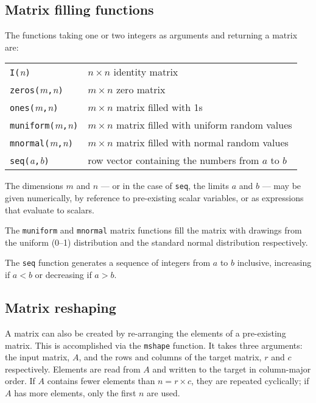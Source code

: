 \subsection{Matrix filling functions}
\label{matrix-fill}

The functions taking one or two integers as arguments and returning
a matrix are:

\begin{center}
\begin{tabular}{ll}
\texttt{I(}\textsl{n}\texttt{)} & $n\times n$ identity matrix \\
\texttt{zeros(}\textsl{m}\texttt{,}\textsl{n}\texttt{)} & 
   $m\times n$ zero matrix \\
\texttt{ones(}\textsl{m}\texttt{,}\textsl{n}\texttt{)} &
   $m\times n$ matrix filled with 1s \\
\texttt{muniform(}\textsl{m}\texttt{,}\textsl{n}\texttt{)} &
   $m\times n$ matrix filled with uniform random values \\
\texttt{mnormal(}\textsl{m}\texttt{,}\textsl{n}\texttt{)} &
   $m\times n$ matrix filled with normal random values \\
\texttt{seq(}\textsl{a}\texttt{,}\textsl{b}\texttt{)} &
   row vector containing the numbers from $a$ to $b$
\end{tabular}
\end{center}

The dimensions $m$ and $n$ --- or in the case of \texttt{seq}, the
limits $a$ and $b$ --- may be given numerically, by reference to
pre-existing scalar variables, or as expressions that evaluate to
scalars.

The \texttt{muniform} and \texttt{mnormal} matrix functions fill the
matrix with drawings from the uniform (0--1) distribution and the
standard normal distribution respectively.

The \texttt{seq} function generates a sequence of integers from $a$
to $b$ inclusive, increasing if $a<b$ or decreasing if $a>b$.

\subsection{Matrix reshaping}
\label{matrix-mshape}

A matrix can also be created by re-arranging the elements of a
pre-existing matrix. This is accomplished via the \texttt{mshape}
function. It takes three arguments: the input matrix, $A$, and the
rows and columns of the target matrix, $r$ and $c$ respectively.
Elements are read from $A$ and written to the target in column-major
order.  If $A$ contains fewer elements than $n = r \times c$, they are
repeated cyclically; if $A$ has more elements, only the first $n$ are
used.

